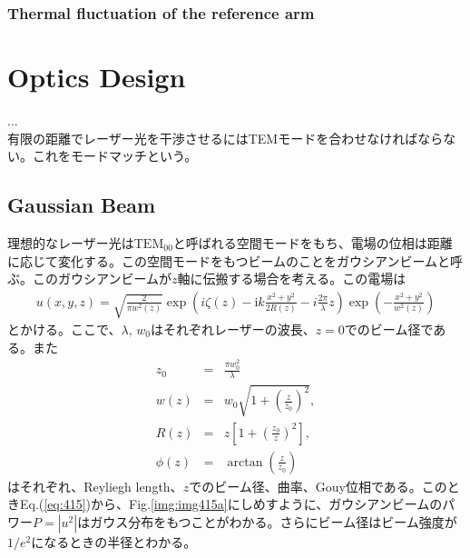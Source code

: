 \subsubsection{Thermal fluctuation of the reference arm }



\section{Optics Design} %
...\\
有限の距離でレーザー光を干渉させるにはTEMモードを合わせなければならない。これをモードマッチという。

\subsection{Gaussian Beam}
理想的なレーザー光は$\mathrm{TEM}_{00}$と呼ばれる空間モードをもち、電場の位相は距離に応じて変化する。この空間モードをもつビームのことをガウシアンビームと呼ぶ。このガウシアンビームが$z$軸に伝搬する場合を考える。この電場は
\begin{eqnarray}
  u(x, y, z)=\sqrt{\frac{2}{\pi{w^2(z)}}} \exp \left(i\zeta(z)-\mathrm{i} k \frac{x^{2} +y^{2}}{2 R(z)}-i\frac{2\pi}{\lambda}z\right)
  \exp \left(-\frac{x^{2}+y^{2}}{w^{2}(z)}\right)  \label{eq:eq415}
\end{eqnarray}
とかける\cite{bond2016interferometer,svelto1998principles}。ここで、$\lambda,\,w_0$はそれぞれレーザーの波長、$z=0$でのビーム径である。また
\begin{eqnarray}
  z_0 &=& \frac{\pi{w^2_0}}{\lambda} \\ \label{eq:eq415_a}
  w(z) &=& w_0\sqrt{1+\left(\frac{z}{z_0}\right)^2}, \\ \label{eq:eq415_b}
  R(z) &=& z\left[1+\left(\frac{z_0}{z}\right)^2\right],\\ \label{eq:eq415_c}
  \phi(z) &=& \arctan\left(\frac{z}{z_0}\right) \label{eq:eq415_d}
\end{eqnarray}
はそれぞれ、Reyliegh length、$z$でのビーム径、曲率、Gouy位相である。このときEq.(\ref{eq:415})から、Fig.\ref{img:img415a}にしめすように、ガウシアンビームのパワー$P=|u^2|$はガウス分布をもつことがわかる。さらにビーム径はビーム強度が$1/e^2$になるときの半径とわかる。
